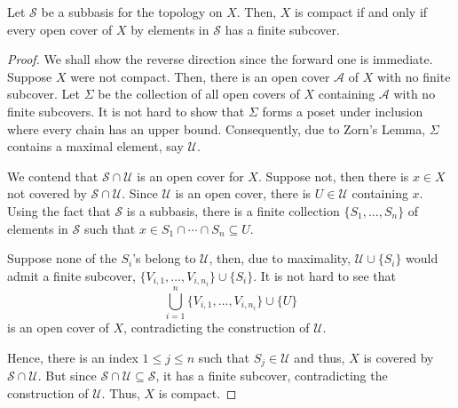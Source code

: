 \begin{theorem}
    Let $\mathcal S$ be a subbasis for the topology on $X$. Then, $X$ is compact if and only if every open cover of $X$ by elements in $\mathcal S$ has a finite subcover.
\end{theorem}
\begin{proof}
    We shall show the reverse direction since the forward one is immediate. Suppose $X$ were not compact. Then, there is an open cover $\mathscr A$ of $X$ with no finite subcover. Let $\Sigma$ be the collection of all open covers of $X$ containing $\mathscr A$ with no finite subcovers. It is not hard to show that $\Sigma$ forms a poset under inclusion where every chain has an upper bound. Consequently, due to Zorn's Lemma, $\Sigma$ contains a maximal element, say $\mathscr U$.

    We contend that $\mathcal S\cap\mathscr U$ is an open cover for $X$. Suppose not, then there is $x\in X$ not covered by $\mathcal S\cap\mathscr U$. Since $\mathscr U$ is an open cover, there is $U\in\mathscr U$ containing $x$. Using the fact that $\mathcal S$ is a subbasis, there is a finite collection $\{S_1,\ldots,S_n\}$ of elements in $\mathcal S$ such that $x\in S_1\cap\cdots\cap S_n\subseteq U$. 

    Suppose none of the $S_i$'s belong to $\mathscr U$, then, due to maximality, $\mathscr U\cup\{S_i\}$ would admit a finite subcover, $\{V_{i,1},\ldots,V_{i,n_i}\}\cup\{S_i\}$. It is not hard to see that 
    \begin{equation*}
        \bigcup_{i = 1}^n\{V_{i,1},\ldots,V_{i,n_i}\}\cup\{U\}
    \end{equation*}
    is an open cover of $X$, contradicting the construction of $\mathscr U$.

    Hence, there is an index $1\le j\le n$ such that $S_j\in\mathscr U$ and thus, $X$ is covered by $\mathcal S\cap\mathscr U$. But since $\mathcal S\cap\mathscr U\subseteq\mathcal S$, it has a finite subcover, contradicting the construction of $\mathscr U$. Thus, $X$ is compact.
\end{proof}

